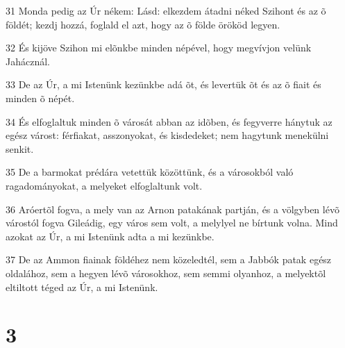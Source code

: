 \par 31 Monda pedig az Úr nékem: Lásd: elkezdem átadni néked Szihont és az õ földét; kezdj hozzá, foglald el azt, hogy az õ földe örököd legyen.
\par 32 És kijöve Szihon mi elõnkbe minden népével, hogy megvívjon velünk Jahácznál.
\par 33 De az Úr, a mi Istenünk kezünkbe adá õt, és levertük õt és az õ fiait és minden õ népét.
\par 34 És elfoglaltuk minden õ városát abban az idõben, és fegyverre hánytuk az egész várost: férfiakat, asszonyokat, és kisdedeket; nem hagytunk menekülni senkit.
\par 35 De a barmokat prédára vetettük közöttünk, és a városokból való ragadományokat, a melyeket elfoglaltunk volt.
\par 36 Aróertõl fogva, a mely van az Arnon patakának partján, és a völgyben lévõ várostól fogva Gileádig, egy város sem volt, a melylyel ne bírtunk volna. Mind azokat az Úr, a mi Istenünk adta a mi kezünkbe.
\par 37 De az Ammon fiainak földéhez nem közeledtél, sem a Jabbók patak egész oldalához, sem a hegyen lévõ városokhoz, sem semmi olyanhoz, a melyektõl  eltiltott téged az Úr, a mi Istenünk.

\chapter{3}

